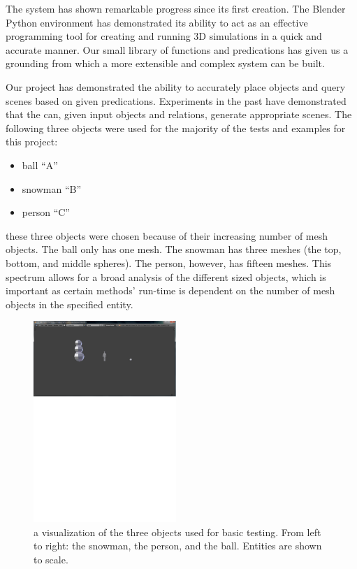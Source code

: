 The system has shown remarkable progress since its first creation. 
The Blender Python environment has demonstrated its ability to act as an effective programming tool for creating and running 3D simulations in a quick and accurate manner. 
Our small library of functions and predications has given us a grounding from which a more extensible and complex system can be built. 

Our project has demonstrated the ability to accurately place objects and query scenes based on given predications.
Experiments in the past have demonstrated that the \TDS can, given input objects and relations, generate appropriate scenes. The following three objects were used for the majority of the tests and examples for this project:
\begin{center}
	\begin{itemize}
		\item ball ``A''
		\item snowman ``B''
		\item person ``C''
	\end{itemize}
\end{center}
these three objects were chosen because of their increasing number of mesh objects. The ball only has one mesh. 
The snowman has three meshes (the top, bottom, and middle spheres). The person, however, has fifteen meshes. 
This spectrum allows for a broad analysis of the different sized objects, which is important as certain methods' run-time is dependent on the number of mesh objects in the specified entity.
\begin{figure}[h]
	\centering
		\includegraphics[width=0.48\textwidth]{figures/models_used.pdf}
	\vspace{-6cm}
	\caption[width=0.5\textwidth]{a visualization of the three objects used for basic testing. From left to right: the snowman, the person, and the ball. Entities are shown to scale.}
	\label{fig:models_used}
\end{figure}

